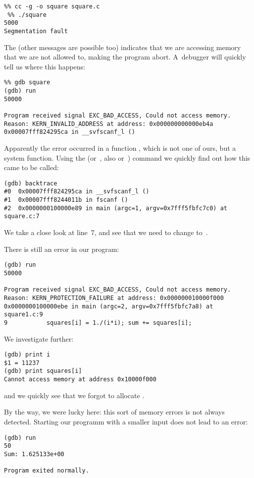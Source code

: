 \begin{verbatim}
%% cc -g -o square square.c
 %% ./square
5000
Segmentation fault
\end{verbatim}
The  (other messages are possible too) 
indicates that we are accessing
memory that we are not allowed to, making the program
abort. A~debugger will quickly tell us where this happens:
\begin{verbatim}
%% gdb square
(gdb) run
50000

Program received signal EXC_BAD_ACCESS, Could not access memory.
Reason: KERN_INVALID_ADDRESS at address: 0x000000000000eb4a
0x00007fff824295ca in __svfscanf_l ()
\end{verbatim}
Apparently the error occurred in a function , which is
not one of ours, but a system function. Using the 
(or~, also  or~) command we quickly find out how
this came to be called:
{\small
\begin{verbatim}
(gdb) backtrace
#0  0x00007fff824295ca in __svfscanf_l ()
#1  0x00007fff8244011b in fscanf ()
#2  0x0000000100000e89 in main (argc=1, argv=0x7fff5fbfc7c0) at square.c:7
\end{verbatim}
}
We take a close look at line~7, and see that we need to
change  to~.

There is still an error in our program:
{\small
\begin{verbatim}
(gdb) run
50000

Program received signal EXC_BAD_ACCESS, Could not access memory.
Reason: KERN_PROTECTION_FAILURE at address: 0x000000010000f000
0x0000000100000ebe in main (argc=2, argv=0x7fff5fbfc7a8) at square1.c:9
9           squares[i] = 1./(i*i); sum += squares[i];
\end{verbatim}
}
We investigate further:
\begin{verbatim}
(gdb) print i
$1 = 11237
(gdb) print squares[i]
Cannot access memory at address 0x10000f000
\end{verbatim}
and we quickly see that we forgot to allocate .

By the way, we were lucky here: this sort of memory errors is not always
detected. Starting our programm with a smaller input does not lead to
an error:
\begin{verbatim}
(gdb) run
50
Sum: 1.625133e+00

Program exited normally.
\end{verbatim}


